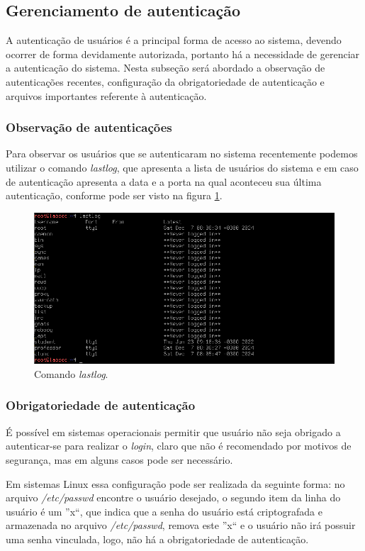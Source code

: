 \documentclass[
  12pt,				%
  oneside,   	        %
  a4paper,			%
  english,			%
  french,				%
  spanish,			%
  brazil,				%
  ]{pacotes/abntex2}
\begin{document}
\subsection{Gerenciamento de autenticação}
A autenticação de usuários é a principal forma de acesso ao sistema, devendo ocorrer de forma devidamente autorizada, portanto há a necessidade de gerenciar a autenticação do sistema. Nesta subseção será abordado a observação de autenticações recentes, configuração da obrigatoriedade de autenticação e arquivos importantes referente à autenticação.

\subsubsection{Observação de autenticações}
Para observar os usuários que se autenticaram no sistema recentemente podemos utilizar o comando \textit{lastlog}, que apresenta a lista de usuários do sistema e em caso de autenticação apresenta a data e a porta na qual aconteceu sua última autenticação, conforme pode ser visto na figura \ref{fig:lastlogs}.

\begin{figure}[H]
  \centering
  \includegraphics[scale=0.7]{figuras/lastlog.png}
  \caption{Comando \textit{lastlog}.}
  \label{fig:lastlogs}
\end{figure}

\subsubsection{Obrigatoriedade de autenticação}
\label{subsubsec:passwd_root}
É possível em sistemas operacionais permitir que usuário não seja obrigado a autenticar-se para realizar o \textit{login}, claro que não é recomendado por motivos de segurança, mas em alguns casos pode ser necessário.

Em sistemas Linux essa configuração pode ser realizada da seguinte forma: no arquivo \textit{/etc/passwd} encontre o usuário desejado, o segundo item da linha do usuário é um ''x``, que indica que a senha do usuário está criptografada e armazenada no arquivo \textit{/etc/passwd}, remova este ''x`` e o usuário não irá possuir uma senha vinculada, logo, não há a obrigatoriedade de autenticação.
\end{document}
